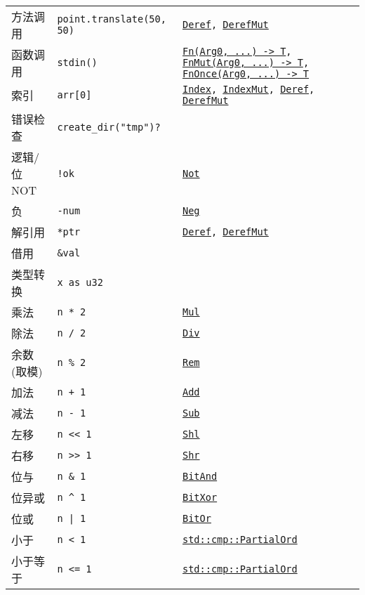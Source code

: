 \begin{longtable}{p{}p{}p{}}
    方法调用       & \texttt{point.translate(50, 50)} & \texttt{\hyperref[deref]{Deref}, \hyperref[deref]{DerefMut}} \\
    函数调用       & \texttt{stdin()}   & \texttt{\hyperref[fn]{Fn(Arg0, ...) -> T}, \hyperref[fn]{FnMut(Arg0, ...) -> T}, \hyperref[fn]{FnOnce(Arg0, ...) -> T}} \\
    索引            & \texttt{arr[0]}   & \texttt{\hyperref[index]{Index}, \hyperref[index]{IndexMut}, \hyperref[deref]{Deref}, \hyperref[deref]{DerefMut}} \\
    \cline{1-2}
    错误检查        & \texttt{create\_dir("tmp")?}   & \\
    \cline{1-2}
    逻辑/位 NOT     & \texttt{!ok}  & \texttt{\hyperref[unop]{Not}} \\
    负             & \texttt{-num}  & \texttt{\hyperref[unop]{Neg}} \\
    解引用          & \texttt{*ptr} & \texttt{\hyperref[deref]{Deref}, \hyperref[deref]{DerefMut}} \\
    借用            & \texttt{\&val}    & \\
    \cline{1-2}
    类型转换    & \texttt{x as u32} & \\
    \cline{1-2}
    乘法        & \texttt{n * 2}    & \texttt{\hyperref[biop]{Mul}} \\
    除法        & \texttt{n / 2}    & \texttt{\hyperref[biop]{Div}} \\
    余数(取模) & \texttt{n \% 2}   & \texttt{\hyperref[biop]{Rem}} \\
    \hline
    加法        & \texttt{n + 1}    & \texttt{\hyperref[biop]{Add}} \\
    减法        & \texttt{n - 1}    & \texttt{\hyperref[biop]{Sub}} \\
    \hline
    左移        & \texttt{n << 1}   & \texttt{\hyperref[biop]{Shl}} \\
    右移        & \texttt{n >> 1}   & \texttt{\hyperref[biop]{Shr}} \\
    \hline
    位与        & \texttt{n \& 1}   & \texttt{\hyperref[biop]{BitAnd}} \\
    \hline
    位异或      & \texttt{n \^{} 1} & \texttt{\hyperref[biop]{BitXor}} \\
    \hline
    位或        & \texttt{n | 1}    & \texttt{\hyperref[biop]{BitOr}}  \\
    \hline
    小于        & \texttt{n < 1}    & \texttt{\hyperref[cmp]{std::cmp::PartialOrd}} \\
    小于等于    & \texttt{n <= 1}   & \texttt{\hyperref[cmp]{std::cmp::PartialOrd}} \\

\end{longtable}
